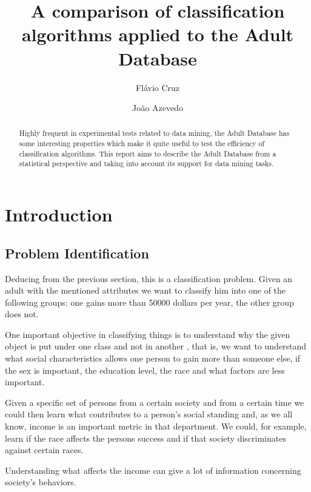 \documentclass[a4paper]{llncs}
\begin{document}
\title{A comparison of classification algorithms applied to the Adult Database}
\author{Flávio Cruz \and João Azevedo}
\maketitle

\begin{abstract}
Highly frequent in experimental tests related to data mining, the Adult Database
has some interesting properties which make it quite useful to test the 
efficiency of classification algorithms. This report aims to describe the Adult
Database from a statistical perspective and taking into account its support for
data mining tasks.
\end{abstract}

\section{Introduction}

\subsection{Problem Identification}

Deducing from the previous section, this is a classification problem. Given an adult
with the mentioned attributes we want to classify him into one of the following groups:
one gains more than 50000 dollars per year, the other group does not.

One important objective in classifying things is to understand why the given object
is put under one class and not in another \cite{2}\cite{3}, that is, we want to understand what social characteristics
allows one person to gain more than someone else, if the sex is important, the education level,
the race and what factors are less important.

Given a specific set of persons from a certain society and from a certain time we could then
learn what contributes to a person's social standing and, as we all know, income is an important
metric in that department. We could, for example, learn if the race affects the persons success and if
that society discriminates against certain races.

Understanding what affects the income can give a lot of information concerning society's behaviors.
\end{document}
